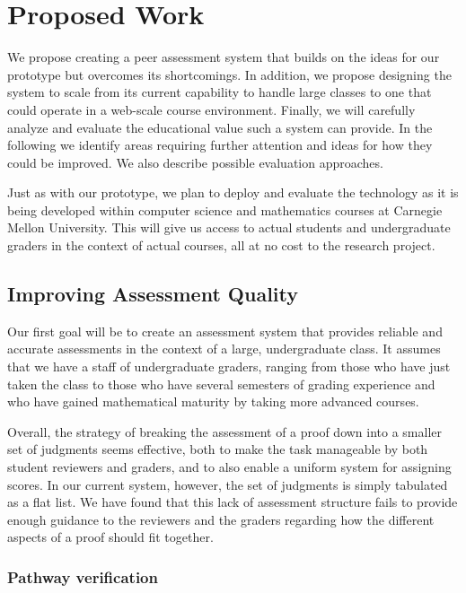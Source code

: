\documentclass[12pt]{article}
\begin{document}
\section{Proposed Work}

We propose creating a peer assessment system that builds on the ideas
for our prototype but overcomes its shortcomings.  In addition, we
propose designing the system to scale from its current capability to
handle large classes to one that could operate in a web-scale course
environment.  Finally, we will carefully analyze and evaluate the
educational value such a system can provide.  In the following we
identify areas requiring further attention and ideas for how they
could be improved.  We also describe possible evaluation approaches.

Just as with our prototype, we plan to deploy and evaluate
the technology as it is being developed within computer science and
mathematics courses at Carnegie Mellon University.  This will give us
access to actual students and undergraduate graders in the context of
actual courses, all at no cost to the research project.

\subsection{Improving Assessment Quality}

Our first goal will be to create an assessment system that provides
reliable and accurate assessments in the context of a large,
undergraduate class.  It assumes that we have a staff of undergraduate
graders, ranging from those who have just taken the class to those who
have several semesters of grading experience and who have gained
mathematical maturity by taking more advanced courses.

Overall, the strategy of breaking the assessment of a proof down into a smaller
set of judgments seems effective, both to make the task manageable by
both student reviewers and graders, and to also enable a uniform
system for assigning scores.  In our current system, however, the set
of judgments is simply tabulated as a flat list.  We have found that
this lack of assessment structure fails to provide enough guidance to the
reviewers and the graders regarding how the different aspects of a
proof should fit together.

\subsubsection*{Pathway verification}
\end{document}
